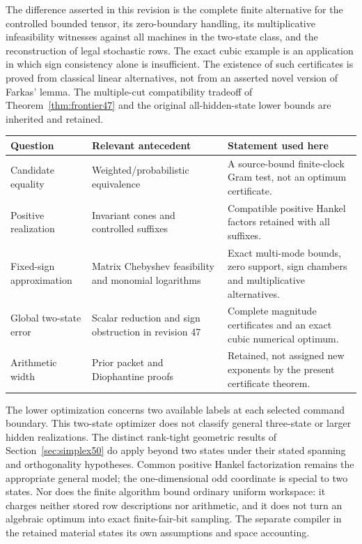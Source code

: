 The difference asserted in this revision is the complete finite
alternative for the controlled bounded tensor, its zero-boundary
handling, its multiplicative infeasibility witnesses against all
machines in the two-state class, and the reconstruction of legal
stochastic rows. The exact cubic example is an application in which
sign consistency alone is insufficient. The existence of such
certificates is proved from classical linear alternatives, not from
an asserted novel version of Farkas' lemma. The multiple-cut
compatibility tradeoff of Theorem~\ref{thm:frontier47} and the original
all-hidden-state lower bounds are inherited and retained.

\begin{center}
\small
\begin{tabular}{p{}p{}p{}}
\toprule
Question & Relevant antecedent & Statement used here\\\midrule
Candidate equality & Weighted/probabilistic equivalence
\cite{Tzeng92,BPP15} & A source-bound finite-clock Gram test, not an optimum certificate.\\[3pt]
Positive realization & Invariant cones and controlled suffixes
\cite{BF04,GTF33} & Compatible positive Hankel factors retained with all suffixes.\\[3pt]
Fixed-sign approximation & Matrix Chebyshev feasibility
\cite{GS19} and monomial logarithms \cite{BKVH07} & Exact multi-mode bounds, zero support, sign chambers and multiplicative alternatives.\\[3pt]
Global two-state error & Scalar reduction and sign obstruction in revision 47
\cite{GTF47} & Complete magnitude certificates and an exact cubic numerical optimum.\\[3pt]
Arithmetic width & Prior packet and Diophantine proofs
\cite{GTF35,GTF42,GTF43} & Retained, not assigned new exponents by the present certificate theorem.\\
\bottomrule
\end{tabular}
\end{center}

The lower optimization concerns two available labels at each selected
command boundary. This two-state optimizer does not classify general three-state or larger hidden realizations. The distinct rank-tight geometric results of Section~\ref{sec:simplex50} do apply beyond two states under their stated spanning and orthogonality hypotheses. Common positive Hankel factorization remains the
appropriate general model; the one-dimensional odd coordinate is
special to two states. Nor does the finite algorithm bound ordinary
uniform workspace: it charges neither stored row descriptions nor
arithmetic, and it does not turn an algebraic optimum into exact
finite-fair-bit sampling. The separate compiler in the retained
material states its own assumptions and space accounting.

